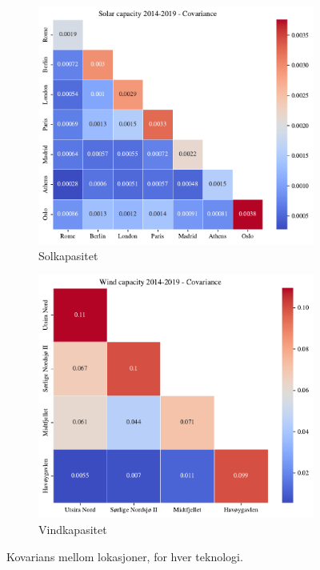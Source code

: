 \documentclass{article}
\begin{document}
\begin{figure}[h]
\centering
\begin{subfigure}{.5\textwidth}
    \centering
    \includegraphics[width=\linewidth]{figures/Solar/Solar capacity 2014-2019 - Covariance.pdf}
    \caption{Solkapasitet}
    \label{fig:cov_sol}
\end{subfigure}%
\begin{subfigure}{.5\textwidth}
    \centering
    \includegraphics[width=\linewidth]{figures/Wind/Wind capacity 2014-2019 - Covariance.pdf}
    \caption{Vindkapasitet}
    \label{fig:cov_vind}
\end{subfigure}
\caption{Kovarians mellom lokasjoner, for hver teknologi.}
\label{fig:covariance}
\end{figure}
\end{document}
